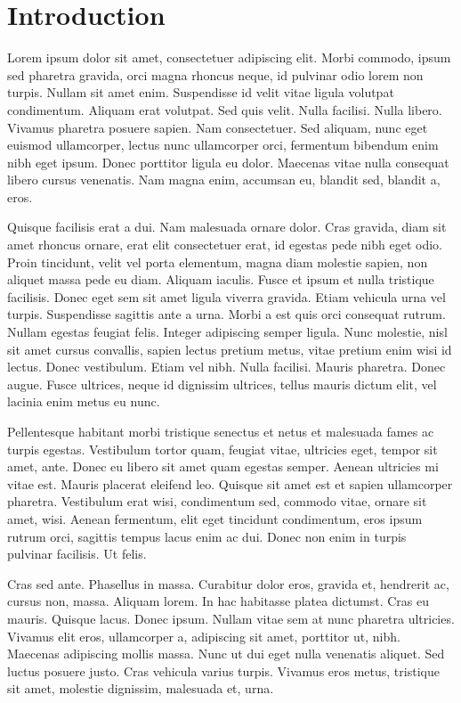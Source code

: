 \chapter{Introduction}
\label{introduction}

Lorem ipsum dolor sit amet, consectetuer adipiscing elit. Morbi commodo, ipsum
sed pharetra gravida, orci magna rhoncus neque, id pulvinar odio lorem non
turpis. Nullam sit amet enim. Suspendisse id velit vitae ligula volutpat
condimentum. Aliquam erat volutpat. Sed quis velit. Nulla facilisi. Nulla
libero. Vivamus pharetra posuere sapien. Nam consectetuer. Sed aliquam, nunc
eget euismod ullamcorper, lectus nunc ullamcorper orci, fermentum bibendum enim
nibh eget ipsum. Donec porttitor ligula eu dolor. Maecenas vitae nulla
consequat libero cursus venenatis. Nam magna enim, accumsan eu, blandit sed,
blandit a, eros.

Quisque facilisis erat a dui. Nam malesuada ornare dolor. Cras gravida, diam
sit amet rhoncus ornare, erat elit consectetuer erat, id egestas pede nibh eget
odio. Proin tincidunt, velit vel porta elementum, magna diam molestie sapien,
non aliquet massa pede eu diam. Aliquam iaculis. Fusce et ipsum et nulla
tristique facilisis. Donec eget sem sit amet ligula viverra gravida. Etiam
vehicula urna vel turpis. Suspendisse sagittis ante a urna. Morbi a est quis
orci consequat rutrum. Nullam egestas feugiat felis. Integer adipiscing semper
ligula. Nunc molestie, nisl sit amet cursus convallis, sapien lectus pretium
metus, vitae pretium enim wisi id lectus. Donec vestibulum. Etiam vel nibh.
Nulla facilisi. Mauris pharetra. Donec augue. Fusce ultrices, neque id
dignissim ultrices, tellus mauris dictum elit, vel lacinia enim metus eu nunc.

Pellentesque habitant morbi tristique senectus et netus et malesuada fames ac
turpis egestas. Vestibulum tortor quam, feugiat vitae, ultricies eget, tempor
sit amet, ante. Donec eu libero sit amet quam egestas semper. Aenean ultricies
mi vitae est. Mauris placerat eleifend leo. Quisque sit amet est et sapien
ullamcorper pharetra. Vestibulum erat wisi, condimentum sed, commodo vitae,
ornare sit amet, wisi. Aenean fermentum, elit eget tincidunt condimentum, eros
ipsum rutrum orci, sagittis tempus lacus enim ac dui. Donec non enim in turpis
pulvinar facilisis. Ut felis.

Cras sed ante. Phasellus in massa. Curabitur dolor eros, gravida et, hendrerit
ac, cursus non, massa. Aliquam lorem. In hac habitasse platea dictumst. Cras eu
mauris. Quisque lacus. Donec ipsum. Nullam vitae sem at nunc pharetra
ultricies. Vivamus elit eros, ullamcorper a, adipiscing sit amet, porttitor ut,
nibh. Maecenas adipiscing mollis massa. Nunc ut dui eget nulla venenatis
aliquet. Sed luctus posuere justo. Cras vehicula varius turpis. Vivamus eros
metus, tristique sit amet, molestie dignissim, malesuada et, urna.

